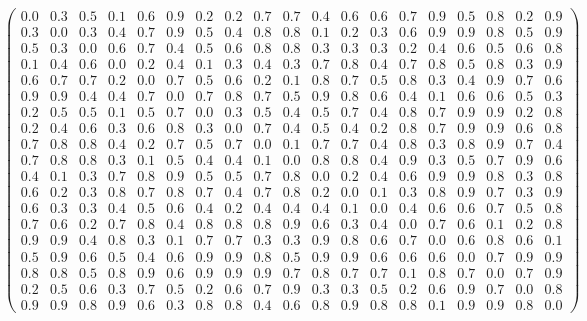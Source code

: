 \documentclass{report}
\begin{document}
$$
\begin{pmatrix}
0.0 & 0.3 & 0.5 & 0.1 & 0.6 & 0.9 & 0.2 & 0.2 & 0.7 & 0.7 & 0.4 & 0.6 & 0.6 & 0.7 & 0.9 & 0.5 & 0.8 & 0.2 & 0.9 \\
0.3 & 0.0 & 0.3 & 0.4 & 0.7 & 0.9 & 0.5 & 0.4 & 0.8 & 0.8 & 0.1 & 0.2 & 0.3 & 0.6 & 0.9 & 0.9 & 0.8 & 0.5 & 0.9 \\
0.5 & 0.3 & 0.0 & 0.6 & 0.7 & 0.4 & 0.5 & 0.6 & 0.8 & 0.8 & 0.3 & 0.3 & 0.3 & 0.2 & 0.4 & 0.6 & 0.5 & 0.6 & 0.8 \\
0.1 & 0.4 & 0.6 & 0.0 & 0.2 & 0.4 & 0.1 & 0.3 & 0.4 & 0.3 & 0.7 & 0.8 & 0.4 & 0.7 & 0.8 & 0.5 & 0.8 & 0.3 & 0.9 \\
0.6 & 0.7 & 0.7 & 0.2 & 0.0 & 0.7 & 0.5 & 0.6 & 0.2 & 0.1 & 0.8 & 0.7 & 0.5 & 0.8 & 0.3 & 0.4 & 0.9 & 0.7 & 0.6 \\
0.9 & 0.9 & 0.4 & 0.4 & 0.7 & 0.0 & 0.7 & 0.8 & 0.7 & 0.5 & 0.9 & 0.8 & 0.6 & 0.4 & 0.1 & 0.6 & 0.6 & 0.5 & 0.3 \\
0.2 & 0.5 & 0.5 & 0.1 & 0.5 & 0.7 & 0.0 & 0.3 & 0.5 & 0.4 & 0.5 & 0.7 & 0.4 & 0.8 & 0.7 & 0.9 & 0.9 & 0.2 & 0.8 \\
0.2 & 0.4 & 0.6 & 0.3 & 0.6 & 0.8 & 0.3 & 0.0 & 0.7 & 0.4 & 0.5 & 0.4 & 0.2 & 0.8 & 0.7 & 0.9 & 0.9 & 0.6 & 0.8 \\
0.7 & 0.8 & 0.8 & 0.4 & 0.2 & 0.7 & 0.5 & 0.7 & 0.0 & 0.1 & 0.7 & 0.7 & 0.4 & 0.8 & 0.3 & 0.8 & 0.9 & 0.7 & 0.4 \\
0.7 & 0.8 & 0.8 & 0.3 & 0.1 & 0.5 & 0.4 & 0.4 & 0.1 & 0.0 & 0.8 & 0.8 & 0.4 & 0.9 & 0.3 & 0.5 & 0.7 & 0.9 & 0.6 \\
0.4 & 0.1 & 0.3 & 0.7 & 0.8 & 0.9 & 0.5 & 0.5 & 0.7 & 0.8 & 0.0 & 0.2 & 0.4 & 0.6 & 0.9 & 0.9 & 0.8 & 0.3 & 0.8 \\
0.6 & 0.2 & 0.3 & 0.8 & 0.7 & 0.8 & 0.7 & 0.4 & 0.7 & 0.8 & 0.2 & 0.0 & 0.1 & 0.3 & 0.8 & 0.9 & 0.7 & 0.3 & 0.9 \\
0.6 & 0.3 & 0.3 & 0.4 & 0.5 & 0.6 & 0.4 & 0.2 & 0.4 & 0.4 & 0.4 & 0.1 & 0.0 & 0.4 & 0.6 & 0.6 & 0.7 & 0.5 & 0.8 \\
0.7 & 0.6 & 0.2 & 0.7 & 0.8 & 0.4 & 0.8 & 0.8 & 0.8 & 0.9 & 0.6 & 0.3 & 0.4 & 0.0 & 0.7 & 0.6 & 0.1 & 0.2 & 0.8 \\
0.9 & 0.9 & 0.4 & 0.8 & 0.3 & 0.1 & 0.7 & 0.7 & 0.3 & 0.3 & 0.9 & 0.8 & 0.6 & 0.7 & 0.0 & 0.6 & 0.8 & 0.6 & 0.1 \\
0.5 & 0.9 & 0.6 & 0.5 & 0.4 & 0.6 & 0.9 & 0.9 & 0.8 & 0.5 & 0.9 & 0.9 & 0.6 & 0.6 & 0.6 & 0.0 & 0.7 & 0.9 & 0.9 \\
0.8 & 0.8 & 0.5 & 0.8 & 0.9 & 0.6 & 0.9 & 0.9 & 0.9 & 0.7 & 0.8 & 0.7 & 0.7 & 0.1 & 0.8 & 0.7 & 0.0 & 0.7 & 0.9 \\
0.2 & 0.5 & 0.6 & 0.3 & 0.7 & 0.5 & 0.2 & 0.6 & 0.7 & 0.9 & 0.3 & 0.3 & 0.5 & 0.2 & 0.6 & 0.9 & 0.7 & 0.0 & 0.8 \\
0.9 & 0.9 & 0.8 & 0.9 & 0.6 & 0.3 & 0.8 & 0.8 & 0.4 & 0.6 & 0.8 & 0.9 & 0.8 & 0.8 & 0.1 & 0.9 & 0.9 & 0.8 & 0.0
\end{pmatrix}
$$
\end{document}
